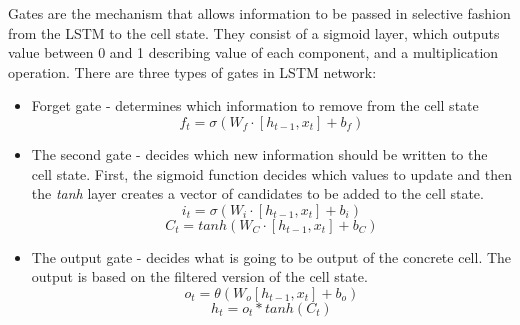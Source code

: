 \documentclass[10pt, a4paper]{article} %
\begin{document}
Gates are the mechanism that allows information to be passed in selective fashion from the LSTM to the cell state. They consist of a sigmoid layer, which outputs value between 0 and 1 describing value of each component, and a multiplication operation.
There are three types of gates in LSTM network:
\begin{itemize}
	\item {Forget gate} - determines which information to remove from the cell state $$ f_{t} = \sigma (W_{f} \cdot [h_{t-1}, x_{t}] + b_{f}) $$
	\item {The second gate} - decides which new information should be written to the cell state. First, the sigmoid function decides which values to update and then the \emph{tanh} layer creates a vector of candidates to be added to the cell state. $$ i_{t} = \sigma (W_{i} \cdot [h_{t-1}, x_{t}] + b_{i}) $$ $$ C_{t} = tanh (W_{C} \cdot [h_{t-1}, x_{t}] + b_{C}) $$
	\item {The output gate} - decides what is going to be output of the concrete cell. The output is based on the filtered version of the cell state. $$ o_{t} = \theta (W_{o} [h_{t-1}, x_{t}] + b_{o}) $$ $$ h_{t} = o_{t} * tanh(C_{t})$$
\end{itemize}

\printbibliography

\end{document}
